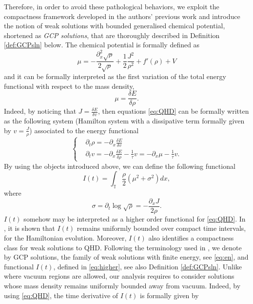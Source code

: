 \documentclass[leqno]{amsart}
\theoremstyle{plain}
\theoremstyle{definition}
\theoremstyle{remark}
\theoremstyle{plain}
\theoremstyle{plain}
\def\T{{\mathbb T}}%
\def\d{{\partial}}
\numberwithin{equation}{section}
\begin{document}
Therefore, in order to avoid these pathological behaviors, we exploit the compactness framework developed in the authors' previous work \cite{AMZ1} and introduce the notion of weak solutions with bounded generalised chemical potential, shortened as \emph{GCP solutions}, that are thoroughly described in Definition \ref{def:GCPsln} below. The chemical potential is formally defined as
\begin{equation}\label{eq:chem}
\mu=-\frac{\d_x^2\sqrt\rho}{2\sqrt\rho}+\frac12\frac{J^2}{\rho^2}+f'(\rho)+V
\end{equation}
and it can be formally interpreted as the first variation of the total energy functional with respect to the mass density,
\[
\mu=\frac{\delta E}{\delta \rho}.
\]
Indeed, by noticing that $J=\frac{\delta E}{\delta v}$, then equations \eqref{eq:QHD} can be formally written as the following system (Hamilton system with a dissipative term formally given by $v=\frac{J}{\rho}$) associated to the energy functional
\begin{equation}\label{eq:Ham_form}
\left\{\begin{aligned}
&\d_t\rho=-\d_x \frac{\delta E}{\delta v}\\
&\d_t v=-\d_x \frac{\delta E}{\delta \rho}-\frac{1}{\tau}v
=-\d_x\mu-\frac1\tau v.
\end{aligned}\right.
\end{equation}
By using the objects introduced above, we can define the following functional
\begin{equation}\label{eq:higher}
I(t)=\int_\T \frac{\rho}{2}(\mu^2+\sigma^2)dx,
\end{equation}
where 
\begin{equation}\label{eq:sigma}
\sigma=\d_t\log\sqrt\rho=-\frac{\d_xJ}{2\rho}.
\end{equation} 
$I(t)$ somehow may be interpreted as a higher order functional for \eqref{eq:QHD}. In \cite{AMZ1}, it is shown that $I(t)$ remains uniformly bounded over compact time intervals, for the Hamiltonian evolution. Moreover, $I(t)$ also identifies a compactness class for weak solutions to QHD.
Following the terminology used in \cite{AMZ1}, we denote by GCP solutions, the family of weak solutions with finite energy, see \eqref{eq:en}, and functional $I(t)$, defined in \eqref{eq:higher}, see also Definition \ref{def:GCPsln}.
Unlike \cite{AMZ1} where vacuum regions are allowed, 
our analysis requires to consider solutions whose mass density remains uniformly bounded away from vacuum.
Indeed, by using \eqref{eq:QHD}, the time derivative of $I(t)$ is formally given by
\end{document}
